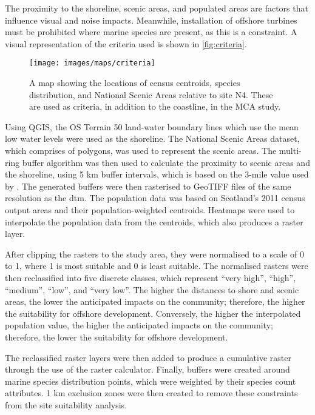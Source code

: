 The proximity to the shoreline, scenic areas, and populated areas are factors
that influence visual and noise impacts. Meanwhile, installation of offshore
turbines must be prohibited where marine species are present, as this is a
constraint. A visual representation of the criteria used is shown in
\autoref{fig:criteria}.

\begin{figure}
\centering
\texttt{[image: images/maps/criteria]}
\caption{A map showing the locations of census centroids, species
distribution, and National Scenic Areas relative to site N4. These are used as
criteria, in addition to the coastline, in the MCA study. \label{fig:criteria}}
\end{figure}

Using QGIS, the OS Terrain 50 land-water boundary lines which use the mean low
water levels were used as the shoreline. The National Scenic Areas dataset,
which comprises of polygons, was used to represent the scenic areas. The
multi-ring buffer algorithm was then used to calculate the proximity to scenic
areas and the shoreline, using 5 km buffer intervals, which is based on the
3-mile value used by \textcite{mekonnen2015}. The generated buffers were then
rasterised to GeoTIFF files of the same resolution as the \gls{dtm}. The
population data was based on Scotland's 2011 census output areas and their
population-weighted centroids. Heatmaps were used to interpolate the population
data from the centroids, which also produces a raster layer.

After clipping the rasters to the study area, they were normalised to a scale
of 0 to 1, where 1 is most suitable and 0 is least suitable. The normalised
rasters were then reclassified into five discrete classes, which represent
``very high'', ``high'', ``medium'', ``low'', and ``very low''. The higher the
distances to shore and scenic areas, the lower the anticipated impacts on the
community; therefore, the higher the suitability for offshore development.
Conversely, the higher the interpolated population value, the higher the
anticipated impacts on the community; therefore, the lower the suitability for
offshore development.

The reclassified raster layers were then added to produce a cumulative raster
through the use of the raster calculator. Finally, buffers were created around
marine species distribution points, which were weighted by their species count
attributes. 1 km exclusion zones were then created to remove these constraints
from the site suitability analysis.

